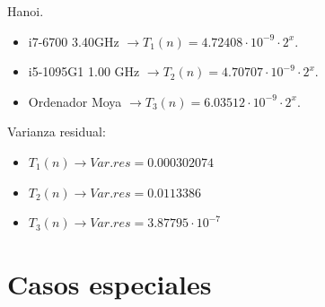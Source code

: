 \documentclass[10pt, xcolor=table]{beamer}
\begin{document}
\begin{frame}[fragile]{Hanoi.
}
\begin{itemize}
	\item i7-6700 3.40GHz \(\rightarrow T_1(n) = 4.72408 \cdot 10^{-9} \cdot 2^x\).
	\item i5-1095G1 1.00 GHz \(\rightarrow T_2(n) = 4.70707 \cdot 10^{-9} \cdot 2^x\).
	\item Ordenador Moya \(\rightarrow T_3(n) = 6.03512 \cdot 10^{-9} \cdot 2^x\).
\end{itemize}

Varianza residual:
\begin{itemize}
	\item \(T_1(n) \longrightarrow Var.res = 0.000302074\)
	\item \(T_2(n) \longrightarrow Var.res = 0.0113386\)
	\item \(T_3(n) \longrightarrow Var.res = 3.87795 \cdot 10^{-7}\)
\end{itemize}
\end{frame}

\section{Casos especiales}
\end{document}
